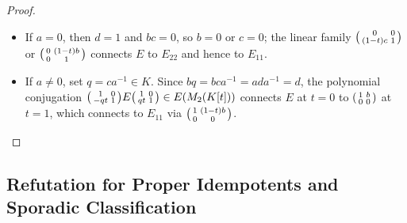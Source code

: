 \documentclass[11pt,a4paper]{article}
\theoremstyle{definition}
\newcommand{\Z}{\mathbb{Z}}
\newenvironment{psmallmatrix}{\left(\begin{smallmatrix}}{\end{smallmatrix}\right)}
\begin{document}
\begin{proof}
\begin{itemize}
\[      \begin{pmatrix}1&0\\ 0&0\end{pmatrix}.
    \]
    (Alternatively, the single degree-$5$ family
    $g(t)E_{11}g(t)^{-1}$ with $g(t)=\begin{psmallmatrix}1&-t\\ 0&1\end{psmallmatrix}\begin{psmallmatrix}1&0\\ t&1\end{psmallmatrix}\begin{psmallmatrix}1&-t\\ 0&1\end{psmallmatrix}\in SL_2(\Z[t])$
    connects $E_{11}$ directly to $E_{22}$.)
  \item If $a=0$, then $d=1$ and $bc=0$, so $b=0$ or $c=0$; the linear family
    $\begin{psmallmatrix}0&0\\ (1-t)c&1\end{psmallmatrix}$ or $\begin{psmallmatrix}0&(1-t)b\\ 0&1\end{psmallmatrix}$
    connects $E$ to $E_{22}$ and hence to $E_{11}$.
  \item If $a\ne 0$, set $q = ca^{-1}\in K$. Since $bq = bca^{-1} = ada^{-1} = d$, the
    polynomial conjugation $\begin{psmallmatrix}1&0\\ -qt&1\end{psmallmatrix}E\begin{psmallmatrix}1&0\\ qt&1\end{psmallmatrix}\in E(M_2(K[t]))$
    connects $E$ at $t=0$ to $\begin{psmallmatrix}1&b\\ 0&0\end{psmallmatrix}$ at $t=1$, which
    connects to $E_{11}$ via $\begin{psmallmatrix}1&(1-t)b\\ 0&0\end{psmallmatrix}$. \qedhere
\end{itemize}
\end{proof}

\subsection{Refutation for Proper Idempotents and Sporadic Classification}
\end{document}
